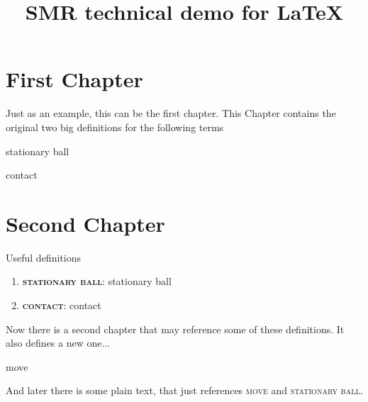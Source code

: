 \documentclass[fontsize=11pt, paper=a4]{report}
\newcommand{\refformat}[1]{{\textsc{#1}}}			 %
\newcommand{\defformat}[1]{{\textbf{\refformat{#1}}}}%
\newcommand{\dtterm}[1]{
\begin{Definition}[name=\defformat{#1}]
	\label{#1}
	 \glsdesc{#1}
\end{Definition}
}
\newcommand{\tref}[1]{\refformat{{#1}}}
\newcommand{\tterm}[1]{
	\defformat{#1}: \glsdesc{#1}
}
\begin{document}
\newcommand{\recap}[1]{\item{\tterm{#1}}}

\title{SMR technical demo for \LaTeX}
\maketitle

\pagestyle{plain}%

\chapter*{First Chapter}
Just as an example, this can be the first chapter. This Chapter contains the original two big definitions for the following terms
\dtterm{stationary ball}
\dtterm{contact}

\newpage

\chapter*{Second Chapter}
Useful definitions
\begin{enumerate}
	\recap{stationary ball}
	\recap{contact}
\end{enumerate}
Now there is a second chapter that may reference some of these definitions. It also defines a new one...
\dtterm{move}
 And later there is some plain text, that just references \tref{move} and \tref{stationary ball}.


\clearpage

\printglossary[title=Definitions, toctitle=List of terms, nonumberlist]
\end{document}
